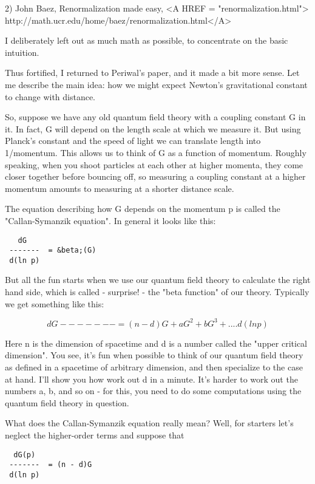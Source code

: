 2) John Baez, Renormalization made easy, <A HREF = "renormalization.html">
http://math.ucr.edu/home/baez/renormalization.html</A>

I deliberately left out as much math as possible, to concentrate 
on the basic intuition.

Thus fortified, I returned to Periwal's paper, and it made a bit 
more sense.  Let me describe the main idea: how we might expect 
Newton's gravitational constant to change with distance.  

So, suppose we have any old quantum field theory with a coupling constant
G in it.  In fact, G will depend on the length scale at which we
measure it.  But using Planck's constant and the speed of light we
can translate length into 1/momentum.  This allows us to think of G
as a function of momentum.   Roughly speaking, when you shoot particles 
at each other at higher momenta, they come closer together before 
bouncing off, so measuring a coupling constant at a higher momentum 
amounts to measuring at a shorter distance scale.  

The equation describing how G depends on the momentum p is called 
the "Callan-Symanzik equation".  In general it looks like this:

\begin{verbatim}
   dG
 -------  = &beta;(G)
 d(ln p)
\end{verbatim}
    
But all the fun starts when we use our quantum field theory to calculate 
the right hand side, which is called - surprise! - the "beta function" 
of our theory.   Typically we get something like this:

$$
   dG 
 -------  = (n - d)G + aG^{2} + bG^{3} + ....
 d(ln p)
$$
    
Here n is the dimension of spacetime and d is a number called the
"upper critical dimension".  You see, it's fun when possible to think
of our quantum field theory as defined in a spacetime of arbitrary
dimension, and then specialize to the case at hand.  I'll show you 
how work out d in a minute.  It's harder to work out the numbers 
a, b, and so on - for this, you need to do some computations using the 
quantum field theory in question.

What does the Callan-Symanzik equation really mean?  Well, for starters 
let's neglect the higher-order terms and suppose that

\begin{verbatim}
  dG(p) 
 -------  = (n - d)G
 d(ln p)
\end{verbatim}
    
